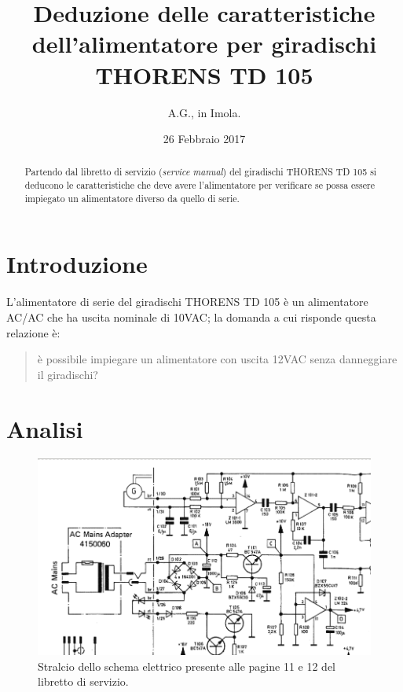 \documentclass[a4paper,12pt]{article} %
\title{Deduzione delle caratteristiche dell'alimentatore per giradischi THORENS TD 105} %
\author{A.G., in Imola.}
\date{26 Febbraio 2017}
\begin{document}
\maketitle %

\begin{abstract} %
Partendo dal libretto di servizio (\emph{service manual}) del giradischi THORENS TD 105 si
deducono le caratteristiche che deve avere l'alimentatore per verificare
se possa essere impiegato un alimentatore diverso da quello di serie.
\end{abstract} %



\section{Introduzione} %
L'alimentatore di serie del giradischi THORENS TD 105 è
un alimentatore AC/AC che ha uscita nominale di 10VAC;
la domanda a cui risponde questa relazione è: 
\begin{quote}
è possibile impiegare un alimentatore con uscita 12VAC
senza danneggiare il giradischi?
\end{quote}

\section{Analisi}
\begin{figure}[h]
\centering
\includegraphics[width=\textwidth]{schematic_thorens}
\caption{Stralcio dello schema elettrico presente alle pagine 11 e 12 del libretto di servizio.}
\label{fig:schema}
\end{figure}
\end{document}
